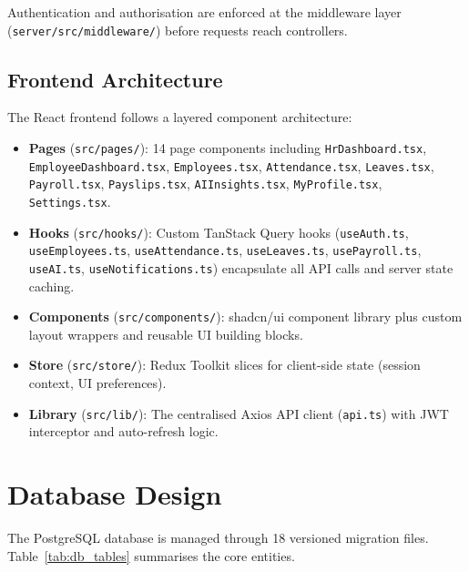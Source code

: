 \documentclass[12pt,a4paper]{report}
\begin{document}
Authentication and authorisation are enforced at the middleware layer (\texttt{server/src/middleware/}) before requests reach controllers.

\subsection{Frontend Architecture}

The React frontend follows a layered component architecture:

\begin{itemize}
    \item \textbf{Pages} (\texttt{src/pages/}): 14 page components including \texttt{HrDashboard.tsx}, \texttt{EmployeeDashboard.tsx}, \texttt{Employees.tsx}, \texttt{Attendance.tsx}, \texttt{Leaves.tsx}, \texttt{Payroll.tsx}, \texttt{Payslips.tsx}, \texttt{AIInsights.tsx}, \texttt{MyProfile.tsx}, \texttt{Settings.tsx}.
    \item \textbf{Hooks} (\texttt{src/hooks/}): Custom TanStack Query hooks (\texttt{useAuth.ts}, \texttt{useEmployees.ts}, \texttt{useAttendance.ts}, \texttt{useLeaves.ts}, \texttt{usePayroll.ts}, \texttt{useAI.ts}, \texttt{useNotifications.ts}) encapsulate all API calls and server state caching.
    \item \textbf{Components} (\texttt{src/components/}): shadcn/ui component library plus custom layout wrappers and reusable UI building blocks.
    \item \textbf{Store} (\texttt{src/store/}): Redux Toolkit slices for client-side state (session context, UI preferences).
    \item \textbf{Library} (\texttt{src/lib/}): The centralised Axios API client (\texttt{api.ts}) with JWT interceptor and auto-refresh logic.
\end{itemize}

\section{Database Design}

The PostgreSQL database is managed through 18 versioned migration files. Table~\ref{tab:db_tables} summarises the core entities.
\end{document}
